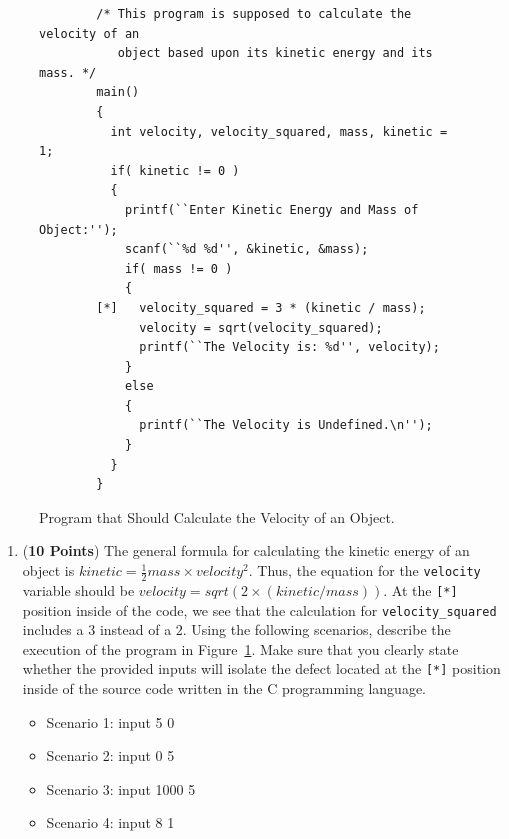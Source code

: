 \documentclass[12pt,epsf,psfig,graphics]{article}
\begin{document}
\begin{enumerate}
\begin{figure}[h]
\footnotesize{
\begin{verbatim}
        /* This program is supposed to calculate the velocity of an
           object based upon its kinetic energy and its mass. */
        main() 
        {
          int velocity, velocity_squared, mass, kinetic = 1;
          if( kinetic != 0 ) 
          {
            printf(``Enter Kinetic Energy and Mass of Object:'');
            scanf(``%d %d'', &kinetic, &mass);
            if( mass != 0 ) 
            {
        [*]   velocity_squared = 3 * (kinetic / mass);
              velocity = sqrt(velocity_squared);
              printf(``The Velocity is: %d'', velocity); 
            }
            else 
            {
              printf(``The Velocity is Undefined.\n'');
            }
          }
        }
\end{verbatim} }

\vspace*{-.2in}

\caption{Program that Should Calculate the Velocity of an Object.}
\label{pie_code}
\end{figure}

\begin{enumerate}

\item \label{need_code} ({\bf 10 Points}) The general formula for calculating the kinetic energy of an object is \(
  kinetic=\frac{1}{2}mass\times velocity^2 \).  Thus, the equation for the {\tt velocity} variable should be \(
  velocity=sqrt(2 \times (kinetic / mass)) \).  At the {\tt [*]} position inside of the code, we see that the
  calculation for {\tt velocity\_squared} includes a $3$ instead of a $2$.  Using the following scenarios, describe the
  execution of the program in Figure~\ref{pie_code}.  Make sure that you clearly state whether the provided inputs will
  isolate the defect located at the {\tt [*]} position inside of the source code written in the C programming language.


\begin{itemize}

\item Scenario 1: input 5 0
\item Scenario 2: input 0 5
\item Scenario 3: input 1000 5
\item Scenario 4: input 8 1

\end{itemize}


\end{enumerate}
\end{enumerate}
\end{document}
